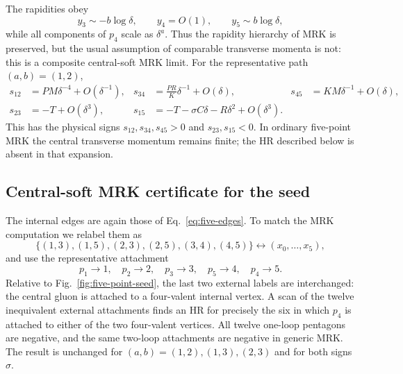 \documentclass[a4paper,11pt]{article}
\begin{document}
The rapidities obey
\begin{equation}
 y_3\sim-b\log\delta,\qquad y_4=O(1),\qquad
 y_5\sim b\log\delta,
 \label{eq:five-mrk-rapidities}
\end{equation}
while all components of \(p_4\) scale as \(\delta^a\).  Thus the rapidity
hierarchy of MRK is preserved, but the usual assumption of comparable
transverse momenta is not: this is a composite central-soft MRK limit.
For the representative path \((a,b)=(1,2)\),
\begin{align}
 s_{12}&=PM\delta^{-4}+O(\delta^{-1}),&
 s_{34}&=\frac{PR}{K}\delta^{-1}+O(\delta),&
 s_{45}&=KM\delta^{-1}+O(\delta),
 \nonumber\\
 s_{23}&=-T+O(\delta^3),&
 s_{15}&=-T-\sigma C\delta-R\delta^2+O(\delta^3).
 \label{eq:five-mrk-invariants}
\end{align}
This has the physical signs \(s_{12},s_{34},s_{45}>0\) and
\(s_{23},s_{15}<0\).  In ordinary five-point MRK the central transverse
momentum remains finite; the HR described below is absent in that expansion.

\subsection{Central-soft MRK certificate for the seed}

The internal edges are again those of Eq.~\eqref{eq:five-edges}.  To match
the MRK computation we relabel them as
\begin{equation}
 \{(1,3),(1,5),(2,3),(2,5),(3,4),(4,5)\}
 \longleftrightarrow(x_0,\ldots,x_5),
 \label{eq:five-mrk-edges}
\end{equation}
and use the representative attachment
\begin{equation}
 p_1\to1,\quad p_2\to2,\quad p_3\to3,\quad
 p_5\to4,\quad p_4\to5.
 \label{eq:five-mrk-attachments}
\end{equation}
Relative to Fig.~\ref{fig:five-point-seed}, the last two external labels are
interchanged: the central gluon is attached to a four-valent internal
vertex.  A scan of the twelve inequivalent external attachments finds an HR
for precisely the six in which \(p_4\) is attached to either of the two
four-valent vertices.  All twelve one-loop pentagons are negative, and the
same two-loop attachments are negative in generic MRK.  The result is
unchanged for \((a,b)=(1,2),(1,3),(2,3)\) and for both signs \(\sigma\).
\end{document}
